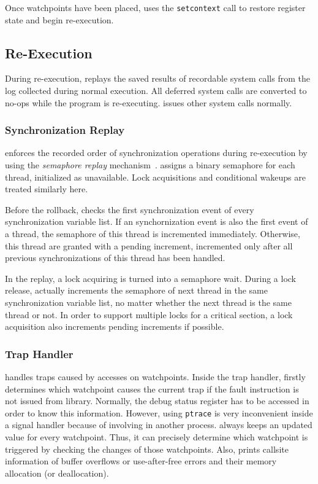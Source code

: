 Once watchpoints have been placed, \doubletake{} uses the \texttt{setcontext} call to restore register state and begin re-execution. 

\subsection{Re-Execution}
\label{sec:implementation/re-execution}

During re-execution, \doubletake{} replays the saved results of recordable system calls from the log collected during normal execution. All deferred system calls are converted to no-ops while the program is re-executing. \doubletake{} issues other system calls normally. 

\subsubsection*{Synchronization Replay}
\doubletake{} enforces the recorded order of synchronization operations during re-execution by using the {\it semaphore replay} mechanism~\cite{TERN}. \doubletake{} assigns a binary semaphore for each thread, initialized as unavailable. Lock acquisitions and conditional wakeups are treated similarly here. 

Before the rollback, \doubletake{} checks the first synchronization event of every synchronization variable list. If an synchornization event is also the first event of a thread, the semaphore of this thread is incremented immediately. Otherwise, this thread are granted with a pending increment, incremented only after all previous synchronizations of this thread has been  handled.  

In the replay, a lock acquiring is turned into a semaphore wait. During a lock release, \doubletake{} actually increments  the semaphore of next thread in the same synchronization variable list, no matter whether the next thread is the same thread or not. In order to support multiple locks for a critical section, a lock acquisition also increments pending increments if possible. 

\subsubsection{Trap Handler}
\doubletake{} handles traps caused by accesses on watchpoints.  Inside the trap handler, \doubletake{} firstly determines which watchpoint causes the current trap if the fault instruction is not issued from \doubletake{} library. Normally, the debug status register has to be accessed in order to know this information. However, using \texttt{ptrace} is very inconvenient inside a signal handler because of involving in another process. \doubletake{} always keeps an updated value for every watchpoint. Thus, it can precisely determine which watchpoint is triggered by checking the changes of those watchpoints. Also, \doubletake{} prints callsite information of buffer overflows or use-after-free errors and their memory allocation (or deallocation). 







